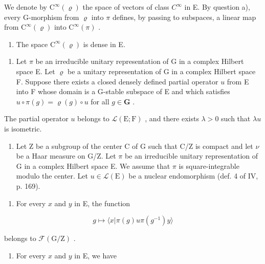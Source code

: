 We denote by \(\mathrm{C}^{\infty}(\varrho)\) the space of vectors of class \(C^{\infty}\) in E. By question a), every G-morphism from \(\varrho\) into \(\pi\) defines, by passing to subspaces, a linear map from \(\mathrm{C}^{\infty}(\varrho)\) into \(\mathrm{C}^{\infty}(\pi)\) .

\begin{enumerate}
\def\labelenumi{\alph{enumi})}
\setcounter{enumi}{1}
\tightlist
\item
  The space \(\mathrm{C}^{\infty}(\varrho)\) is dense in E.
\end{enumerate}

\begin{enumerate}
\def\labelenumi{\arabic{enumi})}
\setcounter{enumi}{12}
\tightlist
\item
  Let \(\pi\) be an irreducible unitary representation of G in a complex Hilbert space E. Let \(\varrho\) be a unitary representation of G in a complex Hilbert space F. Suppose there exists a closed densely defined partial operator \(u\) from E into F whose domain is a G-stable subspace of E and which satisfies \(u \circ \pi(g) = \varrho(g) \circ u\) for all \(g \in \mathbf{G}\) .
\end{enumerate}

The partial operator \(u\) belongs to \(\mathcal{L}(\mathrm{E};\mathrm{F})\) , and there exists \(\lambda > 0\) such that \(\lambda u\) is isometric.

\begin{enumerate}
\def\labelenumi{\arabic{enumi})}
\setcounter{enumi}{13}
\tightlist
\item
  Let Z be a subgroup of the center C of G such that C/Z is compact and let \(\nu\) be a Haar measure on G/Z. Let \(\pi\) be an irreducible unitary representation of G in a complex Hilbert space E. We assume that \(\pi\) is square-integrable modulo the center. Let \(u \in \mathcal{L}(\mathrm{E})\) be a nuclear endomorphism (def. 4 of IV, p. 169).
\end{enumerate}

\begin{enumerate}
\def\labelenumi{\alph{enumi})}
\tightlist
\item
  For every \(x\) and \(y\) in E, the function
\end{enumerate}

\[
g \mapsto \langle x | \pi (g) u \pi (g ^ {- 1}) y \rangle
\]

belongs to \(\mathcal{F}(\mathrm{G / Z})\) .

\begin{enumerate}
\def\labelenumi{\alph{enumi})}
\setcounter{enumi}{1}
\tightlist
\item
  For every \(x\) and \(y\) in E, we have
\end{enumerate}

